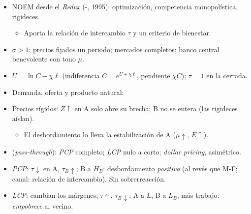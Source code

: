 \documentclass{article}
\begin{document}
\begin{columnas}
\begin{itemize}
\item NOEM desde el \emph{Redux} (-, 1995): optimización, competencia monopolística, rigideces.
  \begin{itemize}
  \item Aporta la relación de intercambio $\tau$ y un criterio de bienestar.
  \end{itemize}
\item $\sigma>1$; precios fijados un periodo; mercados completos; banco central benevolente con tono $\mu$.
\item $U=\ln C-\chi\ell$ (indiferencia $C=e^{U+\chi\ell}$, pendiente $\chi C$); $\tau=1$ en la cerrada.
\end{itemize}
\begin{itemize}
\item Demanda, oferta y producto natural:
\end{itemize}
\begin{itemize}
\item Precios rígidos: $Z\uparrow$ en A solo abre su brecha; B no se entera (las rigideces aíslan).
  \begin{itemize}
  \item El desbordamiento lo lleva la estabilización de A ($\mu\uparrow$, $E\uparrow$).
  \end{itemize}
\item {} (\emph{pass-through}): \emph{PCP} completo; \emph{LCP} nulo a corto; \emph{dollar pricing}, asimétrico.
\item \emph{PCP}: $\tau\downarrow$ en A, $\tau_B\uparrow$; B a $H_B$: desbordamiento \emph{positivo} (al revés que M-F; canal: relación de intercambio). Sin sobrerreacción.
\end{itemize}
\begin{itemize}
\item \emph{LCP}: cambian los márgenes; $\tau\uparrow$, $\tau_B\downarrow$; A a $L$, B a $L_B$, más trabajo: \emph{empobrece} al vecino.

\end{itemize}
\end{columnas}
\end{document}
